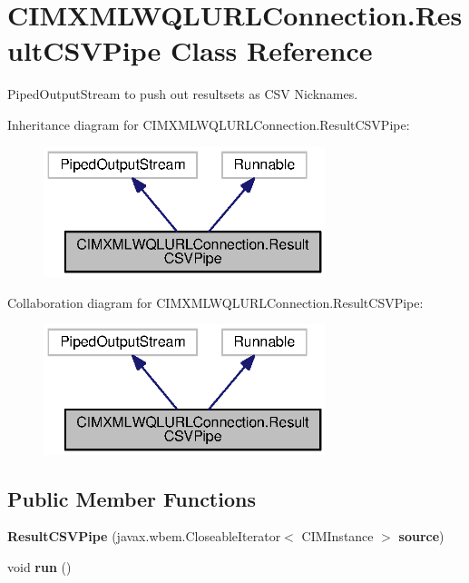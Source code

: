 \section{C\+I\+M\+X\+M\+L\+W\+Q\+L\+U\+R\+L\+Connection.\+Result\+C\+S\+V\+Pipe Class Reference}
\label{classorg_1_1smallfoot_1_1parser_1_1cimcql_1_1CIMXMLWQLURLConnection_1_1ResultCSVPipe}


Piped\+Output\+Stream to push out resultsets as C\+S\+V Nicknames.  




Inheritance diagram for C\+I\+M\+X\+M\+L\+W\+Q\+L\+U\+R\+L\+Connection.\+Result\+C\+S\+V\+Pipe\+:
\nopagebreak
\begin{figure}[H]
\begin{center}
\leavevmode
\includegraphics[width=233pt]{classorg_1_1smallfoot_1_1parser_1_1cimcql_1_1CIMXMLWQLURLConnection_1_1ResultCSVPipe__inherit__graph}
\end{center}
\end{figure}


Collaboration diagram for C\+I\+M\+X\+M\+L\+W\+Q\+L\+U\+R\+L\+Connection.\+Result\+C\+S\+V\+Pipe\+:
\nopagebreak
\begin{figure}[H]
\begin{center}
\leavevmode
\includegraphics[width=233pt]{classorg_1_1smallfoot_1_1parser_1_1cimcql_1_1CIMXMLWQLURLConnection_1_1ResultCSVPipe__coll__graph}
\end{center}
\end{figure}
\subsection*{Public Member Functions}
\begin{DoxyCompactItemize}
\item 
{\bf Result\+C\+S\+V\+Pipe} (javax.\+wbem.\+Closeable\+Iterator$<$ C\+I\+M\+Instance $>$ {\bf source})
\item 
void {\bf run} ()
\end{DoxyCompactItemize}
